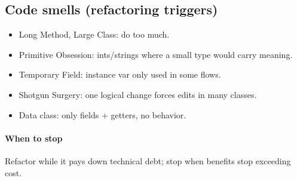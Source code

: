 \subsection{Code smells (refactoring triggers)}
\begin{itemize}
  \item \textcolor{Bittersweet}{Long Method}, \textcolor{Bittersweet}{Large Class}: do too much.
  \item \textcolor{Bittersweet}{Primitive Obsession}: ints/strings where a small type would carry meaning.
  \item \textcolor{Bittersweet}{Temporary Field}: instance var only used in some flows.
  \item \textcolor{Bittersweet}{Shotgun Surgery}: one logical change forces edits in many classes.
  \item \textcolor{Bittersweet}{Data class}: only fields + getters, no behavior.
\end{itemize}

\paragraph{When to stop} Refactor while it pays down \textcolor{Bittersweet}{technical debt}; stop when benefits stop exceeding cost.
